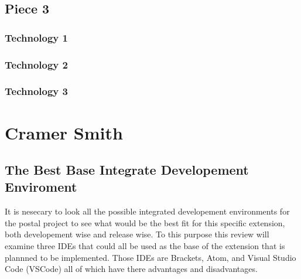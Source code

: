 \documentclass[letterpaper,10pt,titlepage,draftclsnofoot,onecolumn,onesided] {IEEEtran}
\begin{document}
\subsection{Piece 3}
\subsubsection{Technology 1}
\subsubsection{Technology 2}
\subsubsection{Technology 3}


\section{Cramer Smith}
%
\subsection{The Best Base Integrate Developement Enviroment} 
It is nesecary to look all the possible integrated developement environments for the postal project to see what would be the best fit for this specific extension, both developement wise and release wise.
To this purpose this review will examine three IDEs that could all be used as the base of the extension that is plannned to be implemented.
Those IDEs are Brackets, Atom, and Visual Studio Code (VSCode) all of which have there advantages and disadvantages.
\\
\end{document}
